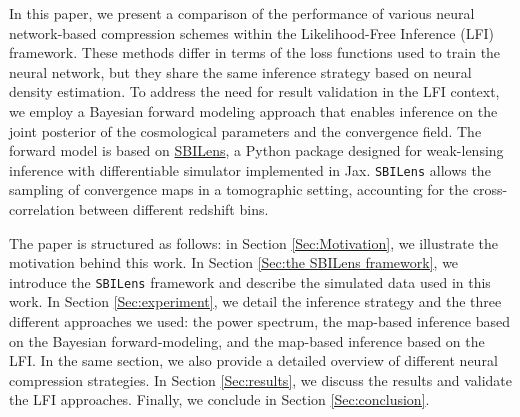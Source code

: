 \documentclass{aa}
\begin{document}
In this paper, we present a comparison of the performance of various neural network-based compression schemes within the Likelihood-Free Inference (LFI) framework. These methods differ in terms of the loss functions used to train the neural network, but they share the same inference strategy based on neural density estimation. To address the need for result validation in the LFI context, we employ a Bayesian forward modeling approach that enables inference on the joint posterior of the cosmological parameters and the convergence field. The forward model is based on \href{https://github.com/DifferentiableUniverseInitiative/sbi_lens}{\url{SBILens}}, a Python package designed for weak-lensing inference with differentiable simulator implemented in Jax. \texttt{SBILens} allows the sampling of convergence maps in a tomographic setting, accounting for the cross-correlation between different redshift bins.



The paper is structured as follows: in Section \ref{Sec:Motivation}, we illustrate the motivation behind this work. In Section \ref{Sec:the SBILens framework}, we introduce the \texttt{SBILens} framework and describe the simulated data used in this work. In Section \ref{Sec:experiment}, we detail the inference strategy and the three different approaches we used: the power spectrum, the map-based inference based on the Bayesian forward-modeling, and the map-based inference based on the LFI. In the same section, we also provide a detailed overview of different neural compression strategies. In Section \ref{Sec:results}, we discuss the results and validate the LFI approaches. Finally, we conclude in Section \ref{Sec:conclusion}. 
\end{document}
